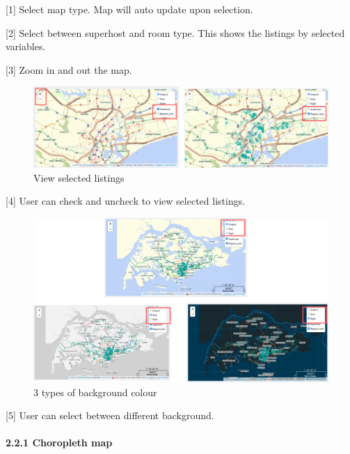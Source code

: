 \documentclass[
  12pt,
]{article}
\begin{document}
{[}1{]} Select map type. Map will auto update upon selection.

{[}2{]} Select between superhost and room type. This shows the listings
by selected variables.

{[}3{]} Zoom in and out the map.

\begin{figure}[H]

{\centering \includegraphics[width=1\linewidth]{images/map1} 

}

\caption{View selected listings}\label{fig:unnamed-chunk-4}
\end{figure}

{[}4{]} User can check and uncheck to view selected listings.

\begin{figure}[H]

{\centering \includegraphics[width=1\linewidth]{images/background} 

}

\caption{3 types of background colour}\label{fig:unnamed-chunk-5}
\end{figure}

{[}5{]} User can select between different background.

\hypertarget{choropleth-map}{%
\paragraph{2.2.1 Choropleth map}\label{choropleth-map}}
\end{document}

